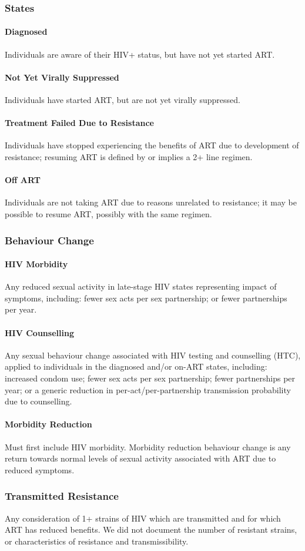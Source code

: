 \subsubsection{States}
\paragraph{Diagnosed}
Individuals are aware of their HIV+ status, but have not yet started ART.
\paragraph{Not Yet Virally Suppressed}
Individuals have started ART, but are not yet virally suppressed.
\paragraph{Treatment Failed Due to Resistance}
Individuals have stopped experiencing the benefits of ART due to development of resistance;
resuming ART is defined by or implies a 2+ line regimen.
\paragraph{Off ART}
Individuals are not taking ART due to reasons unrelated to resistance;
it may be possible to resume ART, possibly with the same regimen.
\subsubsection{Behaviour Change}
\paragraph{HIV Morbidity}
Any reduced sexual activity in late-stage HIV states representing impact of symptoms, including:
fewer sex acts per sex partnership; or fewer partnerships per year.
\paragraph{HIV Counselling}
Any sexual behaviour change associated with HIV testing and counselling (HTC),
applied to individuals in the diagnosed and/or on-ART states, including:
increased condom use;
fewer sex acts per sex partnership;
fewer partnerships per year;
or a generic reduction in per-act/per-partnership transmission probability due to counselling.
\paragraph{Morbidity Reduction}
Must first include HIV morbidity.
Morbidity reduction behaviour change is
any return towards normal levels of sexual activity associated with ART due to reduced symptoms.
\subsubsection{Transmitted Resistance}
Any consideration of 1+ strains of HIV which are transmitted and for which ART has reduced benefits.
We did not document the number of resistant strains,
or characteristics of resistance and transmissibility.
